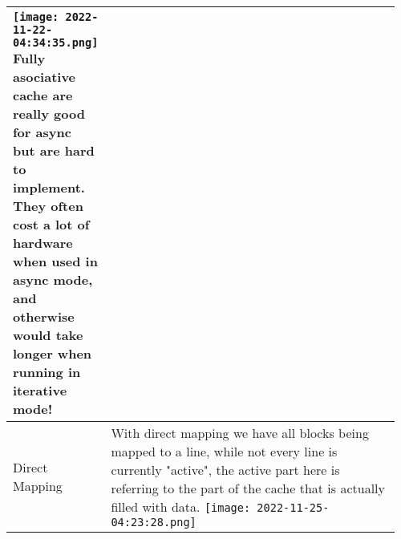 \documentclass[main.tex,fontsize=8pt,paper=a4,paper=portrait,DIV=calc,]{scrartcl}
\begin{document}
\begin{table}[ht!]
\begin{tabular}{|m{0.2\linewidth}|m{0.755\linewidth}|}
\texttt{[image: 2022-11-22-04:34:35.png]}\newline
Fully asociative cache are really good for async but are hard to implement.\newline
They often cost a lot of hardware when used in async mode, and otherwise would take longer when running in iterative mode!\\
\hline
Direct Mapping & 
With direct mapping we have all blocks being mapped to a line, while not every line is currently "active", the active part here is referring to the part of the cache that is actually filled with data.\newline
\texttt{[image: 2022-11-25-04:23:28.png]}\\
\hline
\end{tabular}
\end{table}
\pagebreak
\end{document}
